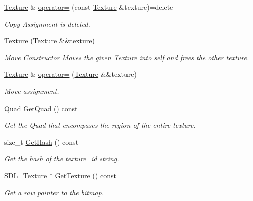 \begin{DoxyCompactItemize}
\mbox{\label{classinferno_1_1graphics_1_1_texture_a43833ad31daec597f4b10bd95b4f9e24}} 
\mbox{\hyperlink{classinferno_1_1graphics_1_1_texture}{Texture}} \& \mbox{\hyperlink{classinferno_1_1graphics_1_1_texture_a43833ad31daec597f4b10bd95b4f9e24}{operator=}} (const \mbox{\hyperlink{classinferno_1_1graphics_1_1_texture}{Texture}} \&texture)=delete
\begin{DoxyCompactList}\small\item\em Copy Assignment is deleted. \end{DoxyCompactList}\item 
\mbox{\hyperlink{classinferno_1_1graphics_1_1_texture_ad7eaa953877ac0b52e215db9840deb53}{Texture}} (\mbox{\hyperlink{classinferno_1_1graphics_1_1_texture}{Texture}} \&\&texture)
\begin{DoxyCompactList}\small\item\em Move Constructor Moves the given \mbox{\hyperlink{classinferno_1_1graphics_1_1_texture}{Texture}} into self and frees the other texture. \end{DoxyCompactList}\item 
\mbox{\hyperlink{classinferno_1_1graphics_1_1_texture}{Texture}} \& \mbox{\hyperlink{classinferno_1_1graphics_1_1_texture_a5409fce4e118c09b6caa012ced780a59}{operator=}} (\mbox{\hyperlink{classinferno_1_1graphics_1_1_texture}{Texture}} \&\&texture)
\begin{DoxyCompactList}\small\item\em Move assignment. \end{DoxyCompactList}\item 
\mbox{\hyperlink{classinferno_1_1graphics_1_1_rectangle}{Quad}} \mbox{\hyperlink{classinferno_1_1graphics_1_1_texture_a34c8a8546474066c66849ca2aceba0fd}{Get\+Quad}} () const
\begin{DoxyCompactList}\small\item\em Get the Quad that encompases the region of the entire texture. \end{DoxyCompactList}\item 
size\+\_\+t \mbox{\hyperlink{classinferno_1_1graphics_1_1_texture_a4c1750e2d5574096d70bdb4cf3b91162}{Get\+Hash}} () const
\begin{DoxyCompactList}\small\item\em Get the hash of the texture\+\_\+id string. \end{DoxyCompactList}\item 
S\+D\+L\+\_\+\+Texture $\ast$ \mbox{\hyperlink{classinferno_1_1graphics_1_1_texture_a42df17ded08f76751332725d66a88ce2}{Get\+Texture}} () const
\begin{DoxyCompactList}\small\item\em Get a raw pointer to the bitmap. \end{DoxyCompactList}\end{DoxyCompactItemize}


